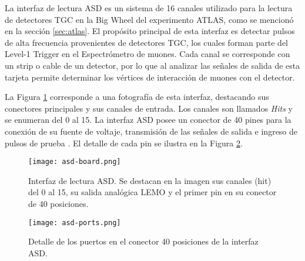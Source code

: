 La interfaz de lectura ASD\cite{1999ATLASICs} es un sistema de 16 canales utilizado para la lectura de detectores TGC en la Big Wheel del experimento ATLAS, como se mencionó en la sección \ref{sec:atlas}. El propósito principal de esta interfaz es detectar pulsos de alta frecuencia provenientes de detectores TGC, los cuales forman parte del Level-1 Trigger en el Espectrómetro de muones. Cada canal se corresponde con un strip o cable de un detector, por lo que al analizar las señales de salida de esta tarjeta permite determinar los vértices de interacción  de muones con el detector.

La Figura \ref{img:asd-board} corresponde a una fotografía de esta interfaz, destacando sus conectores principales y sus canales de entrada. Los canales son llamados \textit{Hits} y se enumeran del 0 al 15. La interfaz ASD posee  un conector de 40 pines para la conexión de su fuente de voltaje, transmisión de las señales de salida  e ingreso de pulsos de prueba . El detalle de cada pin se ilustra en la Figura \ref{img:asd-ports}.  

\begin{figure}[h]
	\centering
	\texttt{[image: asd-board.png]}
	\caption{Interfaz de lectura ASD. Se destacan en la imagen sus canales (hit) del 0 al 15, su salida analógica LEMO y el primer pin en su conector de 40 posiciones.}
	\label{img:asd-board}
\end{figure}

\begin{figure}[h]
	\centering
	\texttt{[image: asd-ports.png]}
	\caption{Detalle de los puertos en el conector 40 posiciones de la interfaz ASD.}
	\label{img:asd-ports}
\end{figure}


